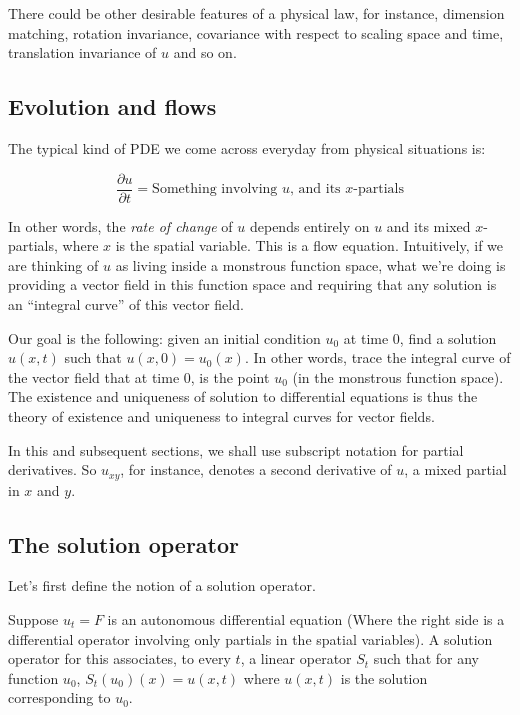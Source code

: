 \documentclass[a4paper]{amsart}
\begin{document}
There could be other desirable features of a physical law, for
instance, dimension matching, rotation invariance, covariance with
respect to scaling space and time, translation invariance of $u$ and
so on.

\subsection{Evolution and flows}

The typical kind of PDE we come across everyday from physical
situations is:

$$\frac{\partial u}{\partial t} = \text{Something involving $u$, and its $x$-partials}$$

In other words, the {\em rate of change} of $u$ depends entirely on
$u$ and its mixed $x$-partials, where $x$ is the spatial
variable. This is a flow equation. Intuitively, if we are thinking of
$u$ as living inside a monstrous function space, what we're doing is
providing a vector field in this function space and requiring that any
solution is an ``integral curve'' of this vector field.

Our goal is the following: given an initial condition $u_0$ at time
$0$, find a solution $u(x,t)$ such that $u(x,0) = u_0(x)$. In other
words, trace the integral curve of the vector field that at time $0$,
is the point $u_0$ (in the monstrous function space). The existence
and uniqueness of solution to differential equations is thus the
theory of existence and uniqueness to integral curves for vector
fields.

In this and subsequent sections, we shall use subscript notation for
partial derivatives. So $u_{xy}$, for instance, denotes a second
derivative of $u$, a mixed partial in $x$ and $y$.
\subsection{The solution operator}

Let's first define the notion of a solution operator.

\begin{definer}
  Suppose $u_t = F$ is an autonomous differential equation (Where the
  right side is a differential operator involving only partials in the
  spatial variables). A solution operator for this associates, to
  every $t$, a linear operator $S_t$ such that for any function $u_0$,
  $S_t(u_0)(x) = u(x,t)$ where $u(x,t)$ is the solution corresponding
  to $u_0$.
\end{definer}
\end{document}
